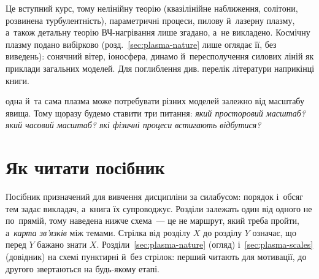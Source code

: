  Це вступний курс, тому нелінійну теорію (квазілінійне наближення, солітони, розвинена турбулентність), параметричні процеси, пилову й~лазерну плазму, а~також детальну теорію ВЧ-нагрівання лише згадано, а~не викладено. Космічну плазму подано вибірково (розд.~\ref{sec:plasma-nature} лише оглядає її, без виведень): сонячний вітер, іоносфера, динамо й~пересполучення силових ліній як приклади загальних моделей. Для поглиблення див. перелік літератури наприкінці книги.


 одна й~та сама плазма може потребувати різних моделей
залежно від масштабу явища. Тому щоразу будемо ставити три питання: \emph{який просторовий
масштаб? який часовий масштаб? які фізичні процеси встигають відбутися?}


\section*{Як читати посібник}

Посібник призначений для вивчення дисципліни за силабусом: порядок і~обсяг тем задає викладач, а~книга
їх супроводжує. Розділи залежать один від одного не по~прямій, тому наведена нижче схема~--- це не маршрут,
який треба пройти, а~\emph{карта зв'язків} між темами. Стрілка від розділу $X$ до розділу $Y$ означає, що
перед $Y$ бажано знати $X$. Розділи~\ref{sec:plasma-nature} (огляд) і~\ref{sec:plasma-scales} (довідник) на схемі пунктирні й~без стрілок: перший читають для мотивації, до другого звертаються на будь-якому етапі.

